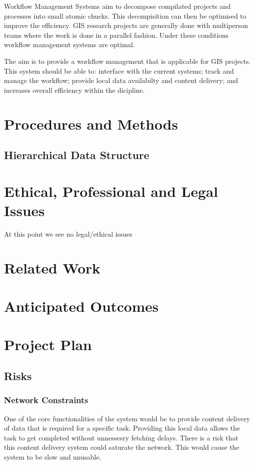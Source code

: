 \documentclass[12pt,a4paper]{article}
\begin{document}
Workflow Management Systems aim to decompose compilated projects and processes into
small atomic chucks. This decompisition can then be optimised to improve the efficiency.
GIS research projects are generally done with multiperson teams where the work is
done in a parallel fashion. Under these conditions workflow management systems
are optimal.

The aim is to provide a workflow management that is applicable for GIS projects.
This system should be able to: interface with the current systems; track and
manage the workflow; provide local data availabilty and content delivery; and
increases overall efficiency within the dicipline.

\section{Procedures and Methods}
\subsection{Hierarchical Data Structure}

\section{Ethical, Professional and Legal Issues}
At this point we see no legal/ethical issues
\section{Related Work}
\section{Anticipated Outcomes}
\section{Project Plan}
\subsection{Risks}
\subsubsection*{Network Constraints}
One of the core functionalities of the system would be to provide
content delivery of data that is required for a specific task. Providing
this local data allows the task to get completed without unnessesry
fetching delays. There is a risk that this content delivery system
could saturate the network. This would cause the system to be slow
and unusable.
\end{document}
